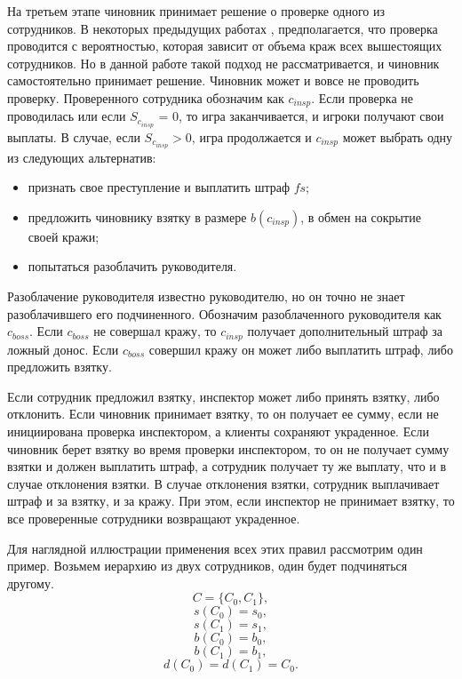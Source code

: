 \par
На третьем этапе чиновник принимает решение о проверке одного из сотрудников. В некоторых предыдущих работах \cite{Orlov}, предполагается, что проверка проводится с вероятностью, которая зависит от объема краж всех вышестоящих сотрудников. Но в данной работе такой подход не рассматривается, и чиновник самостоятельно принимает решение. Чиновник может и вовсе не проводить проверку. Проверенного сотрудника обозначим как $c_{insp}$. Если проверка не проводилась или если $S_{c_{insp}}$ = 0, то игра заканчивается, и игроки получают свои выплаты.
В случае, если $S_{c_{insp}} > 0$, игра продолжается и $c_{insp}$ может выбрать одну из следующих альтернатив:
\begin{itemize}
	\item признать свое преступление и выплатить штраф $fs$;
	\item предложить чиновнику взятку в размере $b(c_{insp})$, в обмен на сокрытие своей кражи;
	\item попытаться разоблачить руководителя. 
\end{itemize}
Разоблачение руководителя известно руководителю, но он точно не знает разоблачившего его подчиненного. Обозначим разоблаченного руководителя как $c_{boss}$. Если $c_{boss}$ не совершал кражу, то $c_{insp}$ получает дополнительный штраф за ложный донос. Если $c_{boss}$ совершил кражу он может либо выплатить штраф, либо предложить взятку.
\par 
Если сотрудник предложил взятку, инспектор может либо принять взятку, либо отклонить. Если чиновник принимает взятку, то он получает ее сумму, если не инициирована проверка инспектором, а клиенты сохраняют украденное. Если чиновник берет взятку во время проверки инспектором, то он не получает сумму взятки и должен выплатить штраф, а сотрудник получает ту же выплату, что и в случае отклонения взятки. В случае отклонения взятки, сотрудник выплачивает штраф и за взятку, и за кражу. При этом, если инспектор не принимает взятку, то все проверенные сотрудники возвращают украденное.
\par
Для наглядной иллюстрации применения всех этих правил рассмотрим один пример.
Возьмем иерархию из двух сотрудников, один будет подчиняться другому.
	$$C = \{C_0, C_1\},$$
	$$s(C_0) = s_0,$$
	$$s(C_1) = s_1,$$
	\begin{equation}\label{eq2.9} b(C_0) = b_0,\end{equation}
	$$b(C_1) = b_1,$$
	$$d(C_0) = d(C_1) = C_0.$$

